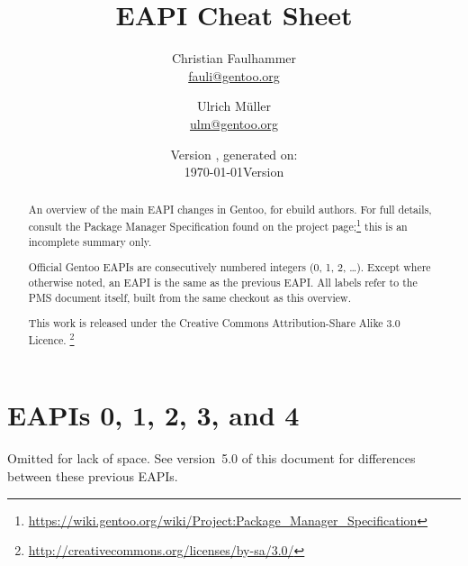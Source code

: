 \documentclass[a4paper,nofoldmark]{leaflet}
\title{EAPI Cheat Sheet}
\author{%
    Christian Faulhammer \\
    \href{mailto:fauli@gentoo.org}{fauli@gentoo.org}
    \and
    Ulrich Müller \\
    \href{mailto:ulm@gentoo.org}{ulm@gentoo.org}
}
\date{Version \version{}, generated on: \\\today}
\date{Version \version\\\printdate{\VCDateISO}}
\newcommand{\code}[1]{\texttt{#1}}
\newcommand{\featureref}[1]{\textsc{#1} on page~\pageref{feat:#1}}
\begin{document}
\maketitle
\thispagestyle{empty}
\begin{abstract}
    An overview of the main EAPI changes in Gentoo, for ebuild
    authors.  For full details, consult the Package Manager
    Specification found on the project page;\footnote{%
    \url{https://wiki.gentoo.org/wiki/Project:Package_Manager_Specification}}
    this is an incomplete summary only.

    Official Gentoo EAPIs are consecutively numbered integers (0, 1,
    2, \dots).  Except where otherwise noted, an EAPI is the same as
    the previous EAPI\@.  All labels refer to the PMS document itself,
    built from the same checkout as this overview.


    This work is released under the Creative Commons
    Attribution-Share Alike 3.0 Licence.%
    \footnote{\url{http://creativecommons.org/licenses/by-sa/3.0/}}
\end{abstract}

\section{EAPIs 0, 1, 2, 3, and 4}
\label{sec:cs:eapi0-2}
Omitted for lack of space. See version~5.0 of this document for
differences between these previous EAPIs.


\end{document}
